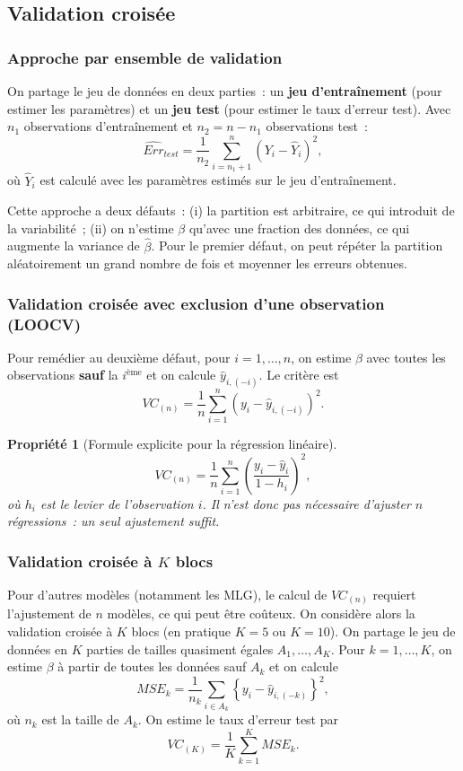 \documentclass[11pt,letterpaper]{article}
\newtheorem{propriete}{Propriété}[section]
\begin{document}
\subsection{Validation croisée}

\subsubsection{Approche par ensemble de validation}

On partage le jeu de données en deux parties~: un \textbf{jeu d'entraînement} (pour estimer les paramètres) et un \textbf{jeu test} (pour estimer le taux d'erreur test). Avec $n_1$ observations d'entraînement et $n_2 = n - n_1$ observations test~:
$$\widehat{Err}_{test} = \frac{1}{n_2}\sum_{i = n_1+1}^{n}(Y_i - \hat Y_i)^2,$$
où $\hat Y_i$ est calculé avec les paramètres estimés sur le jeu d'entraînement.

Cette approche a deux défauts~: (i) la partition est arbitraire, ce qui introduit de la variabilité~; (ii) on n'estime $\beta$ qu'avec une fraction des données, ce qui augmente la variance de $\hat\beta$. Pour le premier défaut, on peut répéter la partition aléatoirement un grand nombre de fois et moyenner les erreurs obtenues.

\subsubsection{Validation croisée avec exclusion d'une observation (LOOCV)}

Pour remédier au deuxième défaut, pour $i = 1,\ldots,n$, on estime $\beta$ avec toutes les observations \textbf{sauf} la $i^{\text{ème}}$ et on calcule $\hat y_{i,(-i)}$. Le critère est
$$VC_{(n)} = \frac{1}{n}\sum_{i=1}^n\left(y_i - \hat y_{i,(-i)}\right)^2.$$

\begin{propriete}[Formule explicite pour la régression linéaire]
$$VC_{(n)} = \frac{1}{n}\sum_{i=1}^n\left(\frac{y_i - \hat y_i}{1 - h_i}\right)^2,$$
où $h_i$ est le levier de l'observation $i$. Il n'est donc pas nécessaire d'ajuster $n$ régressions~: un seul ajustement suffit.
\end{propriete}

\subsubsection{Validation croisée à $K$ blocs}

Pour d'autres modèles (notamment les MLG), le calcul de $VC_{(n)}$ requiert l'ajustement de $n$ modèles, ce qui peut être coûteux. On considère alors la validation croisée à $K$ blocs (en pratique $K = 5$ ou $K = 10$). On partage le jeu de données en $K$ parties de tailles quasiment égales $A_1,\ldots,A_K$. Pour $k = 1,\ldots,K$, on estime $\beta$ à partir de toutes les données sauf $A_k$ et on calcule
$$MSE_k = \frac{1}{n_k}\sum_{i\in A_k}\left\{y_i - \hat y_{i,(-k)}\right\}^2,$$
où $n_k$ est la taille de $A_k$. On estime le taux d'erreur test par
$$VC_{(K)} = \frac{1}{K}\sum_{k=1}^K MSE_k.$$
\end{document}

